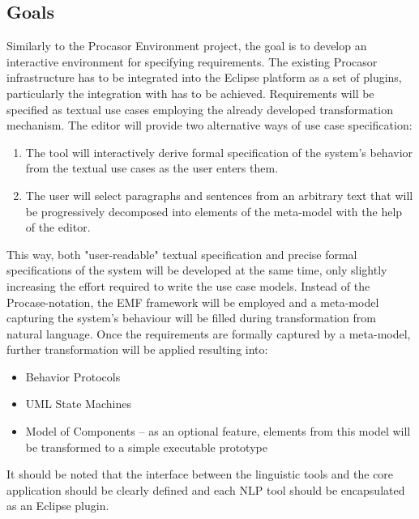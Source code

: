 \subsection{Goals}
Similarly to the Procasor Environment project, the goal is to develop an interactive environment for specifying requirements.  The existing Procasor infrastructure has to be integrated into the Eclipse platform as a set of plugins, particularly the integration with \cite{EMF} has to be achieved.  Requirements will be specified as textual use cases employing the already developed transformation mechanism.  The editor will provide two alternative ways of use case specification:

\begin{enumerate}
\item The tool will interactively derive formal specification of the system's behavior from the textual use cases as the user enters them.
\item The user will select paragraphs and sentences from an arbitrary text that will be progressively decomposed into elements of the meta-model with the help of the editor.
\end{enumerate}
This way, both "user-readable" textual specification and precise formal specifications of the system will be developed at the same time, only slightly increasing the effort required to write the use case models.  Instead of the Procase-notation, the EMF framework will be employed and a meta-model capturing the system's behaviour will be filled during transformation from natural language.  Once the requirements are formally captured by a meta-model, further transformation will be applied resulting into:

\begin{itemize}
\item Behavior Protocols \cite{BehaviourProtocols}
\item UML State Machines \cite{UML-standard}
\item Model of Components -- as an optional feature, elements from this model will be transformed to a simple executable prototype
\end{itemize}
It should be noted that the interface between the linguistic tools and the core application should be clearly defined and each NLP tool should be encapsulated as an Eclipse plugin.

